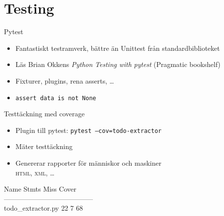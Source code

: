 \section{Testing}

\begin{frame}{Pytest}
  \begin{itemize}
    \item Fantastiskt testramverk, bättre än Unittest från standardbiblioteket
    \item Läs Brian Okkens \emph{Python Testing with pytest} (Pragmatic bookshelf)
    \item Fixturer, plugins, rena asserts, …
    \item \texttt{assert data is not None}
  \end{itemize}
\end{frame}

\begin{frame}{Testtäckning med coverage}
  \begin{itemize}
    \item Plugin till pytest: \texttt{pytest --cov=todo-extractor}
    \item Mäter testtäckning
    \item Genererar rapporter för människor och maskiner\\
          \textsc{html}, \textsc{xml}, …
  \end{itemize}

  \vfill
  {\small\ttfamily
    Name                Stmts   Miss  Cover\\
    ---------------------------------------\\
    todo\_extractor.py      22      7    68%
  }
\end{frame}
